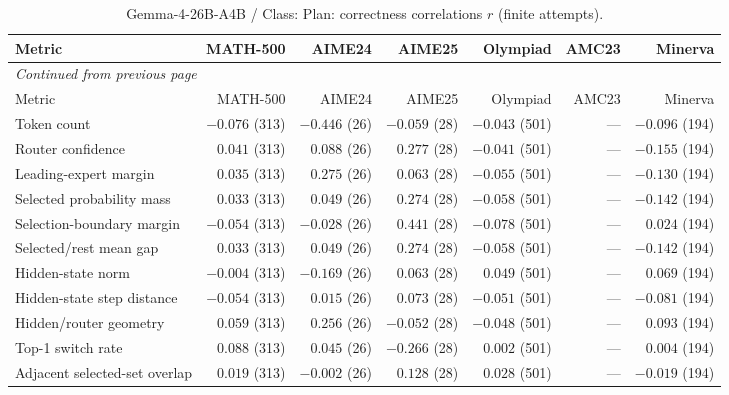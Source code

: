 \begingroup\scriptsize\setlength{\tabcolsep}{4pt}
\begin{longtable}{@{}lrrrrrr@{}}
\caption{Gemma-4-26B-A4B / Class: Plan: correctness correlations $r$ (finite attempts).}\label{tab:multi-gemma-class-Plan}\\
\toprule
Metric & MATH-500 & AIME24 & AIME25 & Olympiad & AMC23 & Minerva \\
\midrule\endfirsthead
\multicolumn{7}{l}{\textit{Continued from previous page}}\\
\toprule
Metric & MATH-500 & AIME24 & AIME25 & Olympiad & AMC23 & Minerva \\
\midrule\endhead
\bottomrule\endfoot
Token count & $-0.076$ (313) & $-0.446$ (26) & $-0.059$ (28) & $-0.043$ (501) & --- & $-0.096$ (194) \\
Router confidence & $0.041$ (313) & $0.088$ (26) & $0.277$ (28) & $-0.041$ (501) & --- & $-0.155$ (194) \\
Leading-expert margin & $0.035$ (313) & $0.275$ (26) & $0.063$ (28) & $-0.055$ (501) & --- & $-0.130$ (194) \\
Selected probability mass & $0.033$ (313) & $0.049$ (26) & $0.274$ (28) & $-0.058$ (501) & --- & $-0.142$ (194) \\
Selection-boundary margin & $-0.054$ (313) & $-0.028$ (26) & $0.441$ (28) & $-0.078$ (501) & --- & $0.024$ (194) \\
Selected/rest mean gap & $0.033$ (313) & $0.049$ (26) & $0.274$ (28) & $-0.058$ (501) & --- & $-0.142$ (194) \\
Hidden-state norm & $-0.004$ (313) & $-0.169$ (26) & $0.063$ (28) & $0.049$ (501) & --- & $0.069$ (194) \\
Hidden-state step distance & $-0.054$ (313) & $0.015$ (26) & $0.073$ (28) & $-0.051$ (501) & --- & $-0.081$ (194) \\
Hidden/router geometry & $0.059$ (313) & $0.256$ (26) & $-0.052$ (28) & $-0.048$ (501) & --- & $0.093$ (194) \\
Top-1 switch rate & $0.088$ (313) & $0.045$ (26) & $-0.266$ (28) & $0.002$ (501) & --- & $0.004$ (194) \\
Adjacent selected-set overlap & $0.019$ (313) & $-0.002$ (26) & $0.128$ (28) & $0.028$ (501) & --- & $-0.019$ (194) \\
\end{longtable}\endgroup

